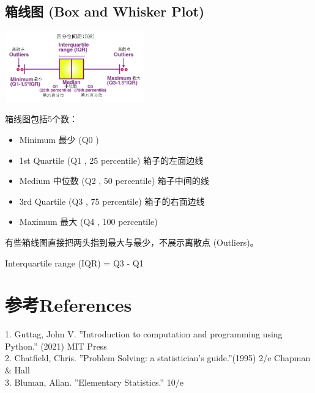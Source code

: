 \hypertarget{ux7bb1ux7ebfux56fe-box-and-whisker-plot}{%
\subsection{箱线图 (Box and Whisker
Plot)}\label{ux7bb1ux7ebfux56fe-box-and-whisker-plot}}


\includegraphics[width=6cm]{BoxWhiskerScreenshot_2021-08-02_2146031.jpg}

箱线图包括5个数：

\begin{itemize}
\tightlist
\item
  Minimum 最少 (Q0 )
\item
  1st Quartile (Q1 , 25 percentile) 箱子的左面边线
\item
  Medium 中位数 (Q2 , 50 percentile) 箱子中间的线
\item
  3rd Quartile (Q3 , 75 percentile) 箱子的右面边线
\item
  Maximum 最大 (Q4 , 100 percentile)
\end{itemize}

有些箱线图直接把两头指到最大与最少，不展示离散点 (Outliers)。

Interquartile range (IQR) = Q3 - Q1

\hypertarget{ux53c2ux8003references}{%
\section{参考References}\label{ux53c2ux8003references}}

1. Guttag, John V. ''Introduction to computation and programming using Python.'' (2021) MIT Press \\
2. Chatfield, Chris.  ''Problem Solving: a statistician's guide.''(1995) 2/e Chapman \& Hall \\
3. Bluman, Allan. ''Elementary Statistics.'' 10/e\\


